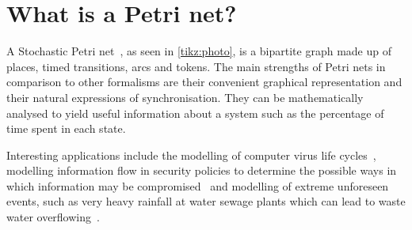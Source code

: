 \section{What is a Petri net?}
A Stochastic Petri net~\cite{bause2002stochastic},  as seen in \cref{tikz:photo}, is a bipartite graph made up of places, timed transitions, arcs and tokens. The main strengths of Petri nets in comparison to other formalisms are their convenient graphical representation and their natural expressions of synchronisation. They can be mathematically analysed to yield useful information about a system such as the percentage of time spent in each state.

 Interesting applications include the modelling of computer virus life cycles~\cite{kotenko2005analyzing}, modelling information flow in security policies to determine the possible ways in which information may be compromised~\cite{varadharajan1990petri} and modelling of extreme unforeseen events, such as very heavy rainfall at water sewage plants which can lead to waste water overflowing~\cite{ghasemieh2013analysis}.